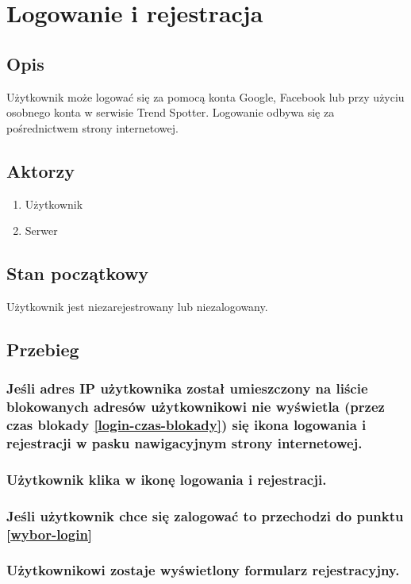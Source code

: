 \documentclass[a4paper]{article}
\begin{document}
\newpage


\section{Logowanie i rejestracja}
\subsection*{Opis}
Użytkownik może logować się za pomocą konta Google, Facebook lub przy użyciu osobnego konta w serwisie Trend Spotter. Logowanie odbywa się za pośrednictwem strony internetowej. 
\subsection*{Aktorzy}
\begin{enumerate}
\item Użytkownik
\item Serwer
\end{enumerate}

\subsection*{Stan początkowy}
Użytkownik jest niezarejestrowany lub niezalogowany.

\subsection{Przebieg}

\subsubsection{Jeśli adres IP użytkownika został umieszczony na liście blokowanych adresów użytkownikowi nie wyświetla (przez czas blokady \ref{login-czas-blokady}) się ikona logowania i rejestracji w pasku nawigacyjnym strony internetowej.} 

\subsubsection{Użytkownik klika w ikonę logowania i rejestracji.}

\subsubsection{Jeśli użytkownik chce się zalogować to przechodzi do punktu \ref{wybor-login}}

\subsubsection{Użytkownikowi zostaje wyświetlony formularz rejestracyjny.}
\end{document}
